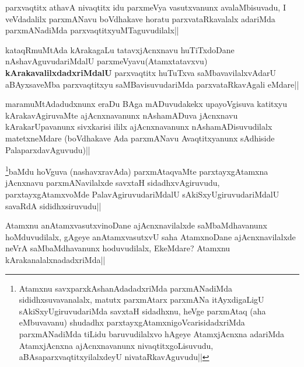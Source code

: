 
\begin{artha}
parxvaqtitx athavA nivaqtitx idu parxmeVya vasutxvanunx avalaMbisuvadu, I veVdadalilx parxmANavu boVdhakave horatu parxvataRkavalalx adariMda parxmANadiMda parxvaqtitxyuMTaguvudilalx||
\end{artha}

\begin{artha}
kataqRmuMtAda kArakagaLu tatavxjAcnxnavu huTiTxdoDane nAshavAguvudariMdalU parxmeVyavu(Atamxtatavxvu) \textbf{kArakavalilxdadxriMdalU} parxvaqtitx huTuTxva saMbavavilalxvAdarU aBAyxsaveMba parxvaqtitxyu saMBavisuvudariMda parxvataRkavAgali eMdare||
\end{artha}

\begin{artha}
maramuMtAdadudxnunx eraDu BAga mADuvudakekx upayoVgisuva katitxyu kArakavAgiruvaMte ajAcnxnavanunx nAshamADuva jAcnxnavu kArakarUpavanunx sivxkarisi ililx ajAcnxnavanunx nAshamADisuvudilalx matetxneMdare (boVdhakave Ada parxmANavu Avaqtitxyanunx sAdhiside PalaparxdavAguvudu)||
\end{artha}

\begin{artha}
\footnote{Atamxnu savxparxkAshanAdadadxriMda parxmANadiMda sididhxsuvavanalalx, matutx parxmAtarx parxmANa itAyxdigaLigU sAkiSxyUgiruvudariMda savxtaH sidadhxnu, heVge parxmAtaq (aha eMbuvavanu) shudadhx parxtayxgAtamxnigoVcarisidadxriMda parxmANadiMda  tiLidu baruvudilalxvo hAgeye AtamxjAcnxna adariMda AtamxjAcnxna ajAcnxnavanunx nivaqtitxgoLisuvudu, aBAsaparxvaqtitxyilalxdeyU nivataRkavAguvudu||}baMdu hoVguva (nashavxravAda) parxmAtaqvaMte parxtayxgAtamxna jAcnxnavu parxmANavilalxde savxtaH sidadhxvAgiruvudu, parxtayxgAtamxvoMde PalavAgiruvudariMdalU sAkiSxyUgiruvudariMdalU savaRdA sididhxsiruvudu||
\end{artha}


\begin{artha}
Atamxnu anAtamxvasutxvinoDane ajAcnxnavilalxde saMbaMdhavanunx hoMduvudilalx, gAgeye anAtamxvasutxvU saha AtamxnoDane ajAcnxnavilalxde neVrA saMbaMdhavanunx hoduvudilalx, EkeMdare? Atamxnu kArakanalalxnadadxriMda||
\end{artha}


